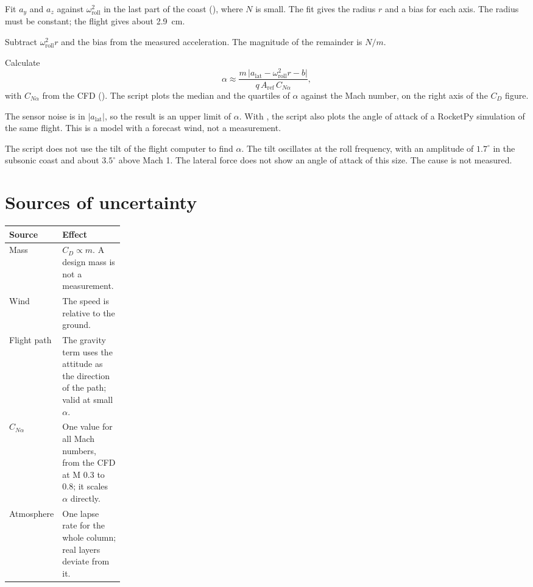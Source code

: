 \begin{steps}
\item Fit $a_y$ and $a_z$ against $\omega_\text{roll}^2$ in the last part of the coast
  (), where $N$ is small. The fit gives the radius $r$ and a bias for
  each axis. The radius must be constant; the flight gives about 2.9~cm.
\item Subtract $\omega_\text{roll}^2 r$ and the bias from the measured acceleration.
  The magnitude of the remainder is $N/m$.
\item Calculate
  \[
    \alpha \approx \frac{m\,\lvert a_\text{lat} - \omega_\text{roll}^2 r - b\rvert}
    {q\,A_\text{ref}\,C_{N\alpha}},
  \]
  with $C_{N\alpha}$ from the CFD (). The script plots the median and the
  quartiles of $\alpha$ against the Mach number, on the right axis of the $C_D$ figure.
\end{steps}

The sensor noise is in $\lvert a_\text{lat}\rvert$, so the result is an upper limit of
$\alpha$. With , the script also plots the angle of attack of a RocketPy simulation
of the same flight. This is a model with a forecast wind, not a measurement.

The script does not use the tilt of the flight computer to find $\alpha$. The tilt
oscillates at the roll frequency, with an amplitude of $1.7^\circ$ in the subsonic
coast and about $3.5^\circ$ above Mach 1. The lateral force does not show an angle of
attack of this size. The cause is not measured.

\section{Sources of uncertainty}

\begin{tabularx}{\linewidth}{@{}P{0.22\linewidth} L@{}}
\toprule
Source & Effect \\
\midrule
Mass & $C_D \propto m$. A design mass is not a measurement. \\
Wind & The speed is relative to the ground. \\
Flight path & The gravity term uses the attitude as the direction of the path; valid at small $\alpha$. \\
$C_{N\alpha}$ & One value for all Mach numbers, from the CFD at M 0.3 to 0.8; it scales $\alpha$ directly. \\
Atmosphere & One lapse rate for the whole column; real layers deviate from it. \\
\bottomrule
\end{tabularx}
